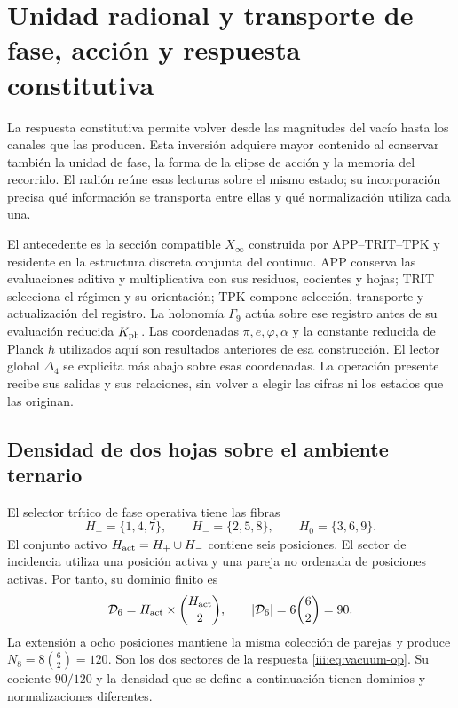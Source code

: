 \section{Unidad radional y transporte de fase, acción y respuesta constitutiva}
\label{iii:sec:radion}

La respuesta constitutiva permite volver desde las magnitudes del vacío hasta
los canales que las producen. Esta inversión adquiere mayor contenido al
conservar también la unidad de fase, la forma de la elipse de acción y la
memoria del recorrido. El radión reúne esas lecturas sobre el mismo estado;
su incorporación precisa qué información se transporta entre ellas y qué
normalización utiliza cada una.

El antecedente es la sección compatible $X_\infty$ construida por
APP--TRIT--TPK y residente en la estructura discreta conjunta del continuo.
APP conserva las evaluaciones aditiva y multiplicativa con sus residuos,
cocientes y hojas; TRIT selecciona el régimen y su orientación; TPK compone
selección, transporte y actualización del registro. La holonomía $\Gamma_9$
actúa sobre ese registro antes de su evaluación reducida $K_{\rm ph}$.
Las coordenadas $\pi,e,\varphi,\alpha$ y la constante reducida de Planck
$\hbar$ utilizados aquí son resultados anteriores de esa construcción.
El lector global $\Delta_4$ se explicita más abajo sobre esas coordenadas.
La operación presente recibe sus salidas y sus relaciones,
sin volver a elegir las cifras ni los estados que las originan.

\subsection{Densidad de dos hojas sobre el ambiente ternario}
\label{iii:subsec:radion-densidad}

El selector trítico de fase operativa tiene las fibras
\[
 H_+=\{1,4,7\},\qquad H_-=\{2,5,8\},\qquad H_0=\{3,6,9\}.
\]
El conjunto activo $H_{\rm act}=H_+\cup H_-$ contiene seis posiciones.
El sector de incidencia utiliza una posición activa y una pareja no ordenada
de posiciones activas. Por tanto, su dominio finito es
\[
 \mathcal D_6=H_{\rm act}\times\binom{H_{\rm act}}2,\qquad
 |\mathcal D_6|=6\binom62=90.
\]
La extensión a ocho posiciones mantiene la misma colección de parejas y
produce $N_8=8\binom62=120$. Son los dos sectores de la respuesta
\eqref{iii:eq:vacuum-op}. Su cociente $90/120$ y la densidad que se define
a continuación tienen dominios y normalizaciones diferentes.

